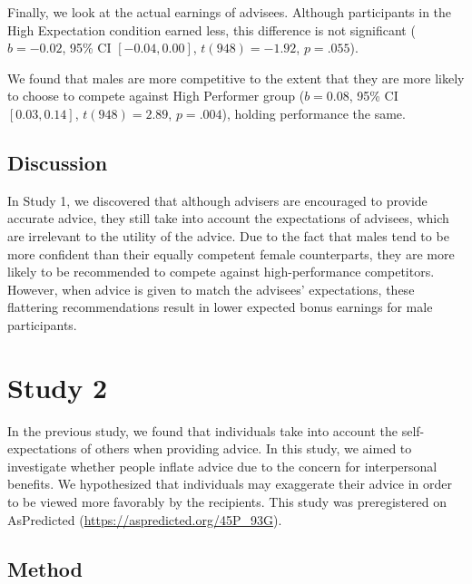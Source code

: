 \documentclass[
  man,floatsintext]{apa6}
\begin{document}
Finally, we look at the actual earnings of advisees. Although participants in the High Expectation condition earned less, this difference is not significant (\(b = -0.02\), 95\% CI \([-0.04, 0.00]\), \(t(948) = -1.92\), \(p = .055\)).

We found that males are more competitive to the extent that they are more likely to choose to compete against High Performer group (\(b = 0.08\), 95\% CI \([0.03, 0.14]\), \(t(948) = 2.89\), \(p = .004\)), holding performance the same.

\hypertarget{discussion}{%
\subsection{Discussion}\label{discussion}}

In Study 1, we discovered that although advisers are encouraged to provide accurate advice, they still take into account the expectations of advisees, which are irrelevant to the utility of the advice. Due to the fact that males tend to be more confident than their equally competent female counterparts, they are more likely to be recommended to compete against high-performance competitors. However, when advice is given to match the advisees' expectations, these flattering recommendations result in lower expected bonus earnings for male participants.

\hypertarget{study-2}{%
\section{Study 2}\label{study-2}}

In the previous study, we found that individuals take into account the self-expectations of others when providing advice. In this study, we aimed to investigate whether people inflate advice due to the concern for interpersonal benefits. We hypothesized that individuals may exaggerate their advice in order to be viewed more favorably by the recipients. This study was preregistered on AsPredicted (\url{https://aspredicted.org/45P_93G}).

\hypertarget{method}{%
\subsection{Method}\label{method}}
\end{document}
